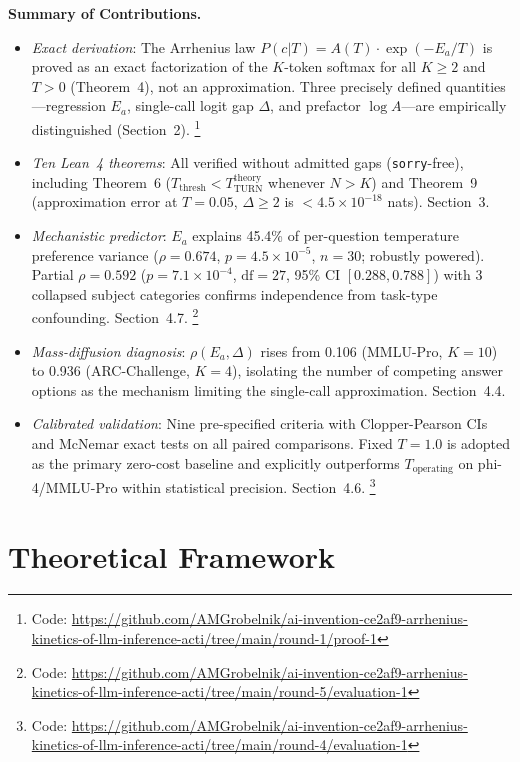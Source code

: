 \documentclass[11pt,letterpaper,twocolumn]{article}
\begin{document}
\textbf{Summary of Contributions.}
\begin{itemize}[leftmargin=*,topsep=2pt,itemsep=2pt]
  \item \emph{Exact derivation}: The Arrhenius law $P(c|T) = A(T) \cdot \exp(-E_a/T)$
  is proved as an exact factorization of the $K$-token softmax for all $K \geq 2$ and
  $T > 0$ (Theorem~4), not an approximation. Three precisely defined quantities---regression
  $E_a$, single-call logit gap $\Delta$, and prefactor $\log A$---are empirically
  distinguished (Section~2).%
  \footnote{Code: \url{https://github.com/AMGrobelnik/ai-invention-ce2af9-arrhenius-kinetics-of-llm-inference-acti/tree/main/round-1/proof-1}}
  \item \emph{Ten Lean~4 theorems}: All verified without admitted gaps
  (\texttt{sorry}-free), including Theorem~6 ($T_\text{thresh} < T_\text{TURN}^\text{theory}$
  whenever $N > K$) and Theorem~9 (approximation error at $T=0.05$, $\Delta \geq 2$ is
  $< 4.5 \times 10^{-18}$ nats). Section~3.
  \item \emph{Mechanistic predictor}: $E_a$ explains 45.4\% of per-question temperature
  preference variance ($\rho = 0.674$, $p = 4.5 \times 10^{-5}$, $n=30$; robustly
  powered). Partial $\rho = 0.592$ ($p = 7.1 \times 10^{-4}$, $\text{df}=27$, 95\% CI
  $[0.288, 0.788]$) with 3 collapsed subject categories confirms independence from
  task-type confounding. Section~4.7.%
  \footnote{Code: \url{https://github.com/AMGrobelnik/ai-invention-ce2af9-arrhenius-kinetics-of-llm-inference-acti/tree/main/round-5/evaluation-1}}
  \item \emph{Mass-diffusion diagnosis}: $\rho(E_a, \Delta)$ rises from 0.106
  (MMLU-Pro, $K=10$) to 0.936 (ARC-Challenge, $K=4$), isolating the number of competing
  answer options as the mechanism limiting the single-call approximation. Section~4.4.
  \item \emph{Calibrated validation}: Nine pre-specified criteria with Clopper-Pearson
  CIs and McNemar exact tests on all paired comparisons. Fixed $T=1.0$ is adopted as the
  primary zero-cost baseline and explicitly outperforms $T_\text{operating}$ on
  phi-4/MMLU-Pro within statistical precision. Section~4.6.%
  \footnote{Code: \url{https://github.com/AMGrobelnik/ai-invention-ce2af9-arrhenius-kinetics-of-llm-inference-acti/tree/main/round-4/evaluation-1}}
\end{itemize}

\section{Theoretical Framework}
\end{document}
